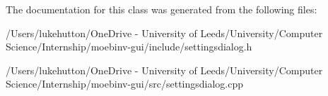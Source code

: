 The documentation for this class was generated from the following files\+:\begin{DoxyCompactItemize}
\item 
/\+Users/lukehutton/\+One\+Drive -\/ University of Leeds/\+University/\+Computer Science/\+Internship/moebinv-\/gui/include/settingsdialog.\+h\item 
/\+Users/lukehutton/\+One\+Drive -\/ University of Leeds/\+University/\+Computer Science/\+Internship/moebinv-\/gui/src/settingsdialog.\+cpp\end{DoxyCompactItemize}
